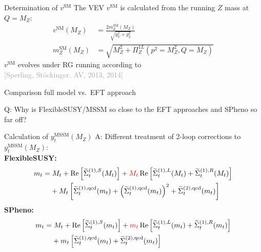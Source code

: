 \documentclass[hyperref={pdfpagelabels=false},ngerman]{beamer}
\newcommand{\bigcite}[1]{\textcolor{darkgray}{[#1]}}
\DeclareMathOperator{\re}{Re}
\renewcommand{\emph}{\textbf}
\newcommand{\SM}{\ensuremath{\text{SM}}}
\begin{document}
\begin{frame}[noframenumbering]{Determination of $v^\SM$}
  The VEV $v^\SM$ is calculated from the running $Z$ mass at $Q = M_Z$:
  \begin{align*}
    v^{\SM}(M_Z) &= \frac{2 m_Z^{\SM}(M_Z)}{\sqrt{g_Y^2 + g_2^2}} \\
    m_Z^{\SM}(M_Z) &= \sqrt{M_Z^2 + \Pi_Z^{1L}(p^2=M_Z^2,Q=M_Z)}
  \end{align*}
  $v^{\SM}$ evolves under RG running according to\\\bigcite{Sperling,
    Stöckinger, AV, 2013, 2014}
\end{frame}


\begin{frame}[noframenumbering]{Comparison full model vs.\ EFT approach}
  \begin{center}
    Q: Why is FlexibleSUSY/MSSM so close to the EFT approaches and
    SPheno so far off?
  \end{center}
\end{frame}

\begin{frame}[noframenumbering]{Calculation of $y_t^{\text{MSSM}}(M_Z)$}
  A: Different treatment of 2-loop corrections to $y_t^{\text{MSSM}}(M_Z)$:
  \\[1em]
  \emph{FlexibleSUSY:}
  \begin{align*}
    m_t &=
    M_t+\re\left[
      \widetilde{\Sigma}_t^{(1),S}(M_t)\right] +
    \textcolor{red}{M_t} \re\left[
      \widetilde{\Sigma}_t^{(1),L}(M_t) +
      \widetilde{\Sigma}_t^{(1),R}(M_t)
    \right] \nonumber \\
    &\phantom{={}} + M_t
    \left[\widetilde{\Sigma}_t^{(1),\text{qcd}}(m_t)
      + \left(\widetilde{\Sigma}_t^{(1),\text{qcd}}(m_t)\right)^2
      + \widetilde{\Sigma}_t^{(2),\text{qcd}}(m_t)\right]
  \end{align*}
  \emph{SPheno:}
  \begin{align*}
    m_t &=
    M_t+\re\left[
      \widetilde{\Sigma}_t^{(1),S}(m_t)\right]+
    \textcolor{red}{m_t} \re\left[
      \widetilde{\Sigma}_t^{(1),L}(m_t) +
      \widetilde{\Sigma}_t^{(1),R}(m_t)
    \right] \nonumber \\
    &\phantom{={}} +
    m_t
    \left[\widetilde{\Sigma}_t^{(1),\text{qcd}}(m_t) +
      \widetilde{\Sigma}_t^{(2),\text{qcd}}(m_t)
    \right]
  \end{align*}
\end{frame}
\end{document}
